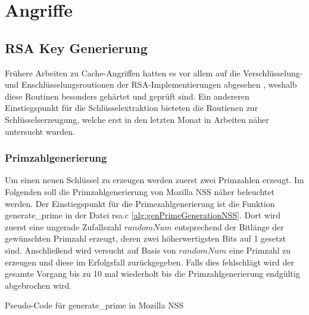 \chapter{Angriffe}
\label{chapter:results}

\section{RSA Key Generierung}

Frühere Arbeiten zu Cache-Angriffen hatten es vor allem auf die Verschlüsselung- und Enschlüsselungsroutionen der RSA-Implementierungen abgesehen \cite{}, weshalb diese Routinen besonders gehärtet und geprüft sind.
Ein andereren Einstiegspunkt für die Schlüsselextraktion bieteten die Routienen zur Schlüsselserzeugung, welche erst in den letzten Monat in Arbeiten näher untersucht wurden.

\subsection{Primzahlgenerierung}

Um einen neuen Schlüssel zu erzeugen werden zuerst zwei Primzahlen erzeugt. Im Folgenden soll die Primzahlgenerierung von Mozilla NSS näher beleuchtet werden.
Der Einstiegspunkt für die Primezahlgenerierung ist die Funktion generate_prime in der Datei rsa.c \ref{alg:genPrimeGenerationNSS}.
Dort wird zuerst eine ungerade Zufallszahl $randomNum$ entsprechend der Bitlänge der gewünschten Primzahl erzeugt, deren zwei höherwertigsten Bits auf 1 gesetzt sind.
Anschließend wird versucht auf Basis von $randomNum$ eine Primzahl zu erzeugen und diese im Erfolgsfall zurückgegeben.
Falls dies fehlschlägt wird der gesamte Vorgang bis zu 10 mal wiederholt bis die Primzahlgenerierung endgültig abgebrochen wird.

\begin{algorithm}[h]
\DontPrintSemicolon
\caption{Pseudo-Code für generate_prime in Mozilla NSS}
\label{alg:genPrimeGenerationNSS}

\end{algorithm}

